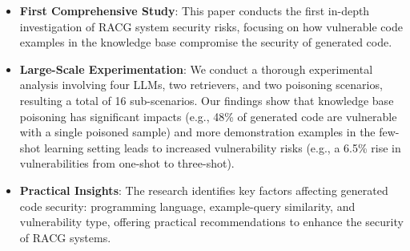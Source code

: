 \begin{itemize}[leftmargin=*]
    \item {\bf First Comprehensive Study}: This paper conducts the first in-depth investigation of RACG system security risks, focusing on how vulnerable code examples in the knowledge base compromise the security of generated code.
    \item {\bf Large-Scale Experimentation}: We conduct a thorough experimental analysis involving four LLMs, two retrievers, and two poisoning scenarios, resulting a total of 16 sub-scenarios. Our findings show that knowledge base poisoning has significant impacts (e.g., 48\% of generated code are vulnerable with a single poisoned sample) and more demonstration examples in the few-shot learning setting leads to increased vulnerability risks (e.g., a 6.5\% rise in vulnerabilities from one-shot to three-shot).
    \item {\bf Practical Insights}: The research identifies key factors affecting generated code security: programming language, example-query similarity, and vulnerability type, offering practical recommendations to enhance the security of RACG systems.
\end{itemize}

